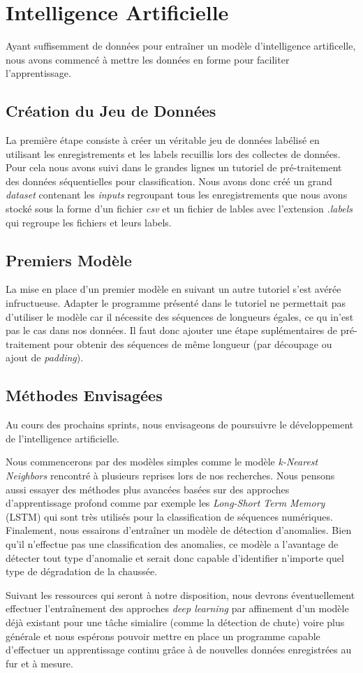 \section{Intelligence Artificielle}
Ayant suffisemment de données pour entraîner un modèle d'intelligence artificelle, nous avons commencé à mettre les données en forme pour faciliter l'apprentissage.

\subsection{Création du Jeu de Données}
La première étape consiste à créer un véritable jeu de données labélisé en utilisant les enregistrements et les labels recuillis lors des collectes de données.
Pour cela nous avons suivi dans le grandes lignes un tutoriel de pré-traitement des données séquentielles pour classification.\cite{tuto_1} Nous avons donc créé un grand \textit{dataset} contenant les \textit{inputs} regroupant tous les enregistrements que nous avons stocké sous la forme d'un fichier \textit{csv} et un fichier de lables avec l'extension \textit{.labels} qui regroupe les fichiers et leurs labels.

\subsection{Premiers Modèle}
La mise en place d'un premier modèle en suivant un autre tutoriel s'est avérée infructueuse. Adapter le programme présenté dans le tutoriel ne permettait pas d'utiliser le modèle car il nécessite des séquences de longueurs égales, ce qu in'est pas le cas dans nos données.\cite{tuto_2} Il faut donc ajouter une étape suplémentaires de pré-traitement pour obtenir des séquences de même longueur (par découpage ou ajout de \textit{padding}).

\subsection{Méthodes Envisagées}
Au cours des prochains sprints, nous envisageons de poursuivre le développement de l'intelligence artificielle.

Nous commencerons par des modèles simples comme le modèle \textit{k-Nearest Neighbors} rencontré à plusieurs reprises lors de nos recherches. Nous pensons aussi essayer des méthodes plus avancées basées sur des approches d'apprentissage profond comme par exemple les \textit{Long-Short Term Memory} (LSTM) qui sont très utilisés pour la classification de séquences numériques. Finalement, nous essairons d'entraîner un modèle de détection d'anomalies. Bien qu'il n'effectue pas une classification des anomalies, ce modèle a l'avantage de détecter tout type d'anomalie et serait donc capable d'identifier n'importe quel type de dégradation de la chaussée.

Suivant les ressources qui seront à notre disposition, nous devrons éventuellement effectuer l'entraînement des approches \textit{deep learning} par affinement d'un modèle déjà existant pour une tâche simialire (comme la détection de chute) voire plus générale et nous espérons pouvoir mettre en place un programme capable d'effectuer un apprentissage continu grâce à de nouvelles données enregistrées au fur et à mesure.